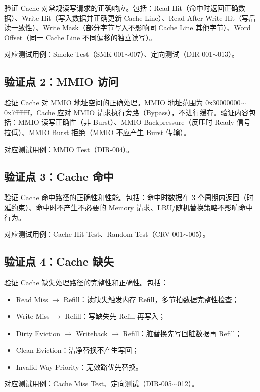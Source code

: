 \documentclass[12pt,a4paper]{ctexart}
\begin{document}
验证 Cache 对常规读写请求的正确响应。包括：Read Hit（命中时返回正确数据）、Write Hit（写入数据并正确更新 Cache Line）、Read-After-Write Hit（写后读一致性）、Write Mask（部分字节写入不影响同 Cache Line 其他字节）、Word Offset（同一 Cache Line 不同偏移的独立读写）。

对应测试用例：Smoke Test（SMK-001$\sim$007）、定向测试（DIR-001$\sim$013）。

\subsection{验证点 2：MMIO 访问}

验证 Cache 对 MMIO 地址空间的正确处理。MMIO 地址范围为 0x30000000$\sim$0x7fffffff，Cache 应对 MMIO 请求执行旁路（Bypass），不进行缓存。验证内容包括：MMIO 读写正确性（非 Burst）、MMIO Backpressure（反压时 Ready 信号拉低）、MMIO Burst 拒绝（MMIO 不应产生 Burst 传输）。

对应测试用例：MMIO Test（DIR-004）。

\subsection{验证点 3：Cache 命中}

验证 Cache 命中路径的正确性和性能。包括：命中时数据在 3 个周期内返回（时延约束）、命中时不产生不必要的 Memory 请求、LRU/随机替换策略不影响命中行为。

对应测试用例：Cache Hit Test、Random Test（CRV-001$\sim$005）。

\subsection{验证点 4：Cache 缺失}

验证 Cache 缺失处理路径的完整性和正确性。包括：
\begin{itemize}[leftmargin=*]
  \item Read Miss $\rightarrow$ Refill：读缺失触发内存 Refill，多节拍数据完整性检查；
  \item Write Miss $\rightarrow$ Refill：写缺失先 Refill 再写入；
  \item Dirty Eviction $\rightarrow$ Writeback $\rightarrow$ Refill：脏替换先写回脏数据再 Refill；
  \item Clean Eviction：洁净替换不产生写回；
  \item Invalid Way Priority：无效路优先替换。
\end{itemize}

对应测试用例：Cache Miss Test、定向测试（DIR-005$\sim$012）。
\end{document}

